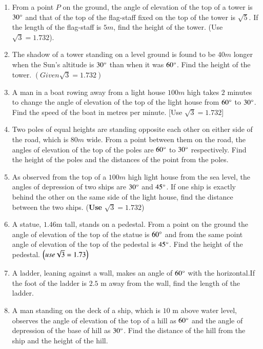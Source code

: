 \begin{enumerate}[label=\thesubsection.\arabic*.,ref=\thesubsection.\theenumi]
\hfill{}\item From a point $P$ on the ground, the angle of elevation of the top of a tower is $30\degree$ and that of the top of the flag-staff fixed on the top of the tower is $\sqrt{5}$. If the length of the flag-staff is $5 m$, find the height of the tower. (Use $\sqrt{3}= 1.732$).


\hfill{}\item The shadow of a tower standing on a level ground is found to be $40 m$ longer when the Sun's altitude is $30\degree$ than when it was $60\degree$. Find the height of the tower. $(Given \sqrt{3} = 1.732)$

\hfill{}\item A man in a boat rowing away from a light house $100m$  high takes $2$ minutes to change the angle of elevation of the top of the light house from $60\degree$ to $30\degree$. Find the speed of the boat in metres per minute. [Use $\sqrt{3}=1.732$]
\hfill{}\item Two poles of equal heights are standing opposite each other on either side of the road, which is $80 m$  wide. From a point between them on the road, the angles of elevation of the top of the poles are $60\degree$ to $30\degree$ respectively. Find the height of the poles and the distances of the point from the poles.
\hfill{}
		\item As observed from the top of a $100 m$ high light house from the sea level, the angles of depression of two ships are $30\degree$ and $45\degree$. If one ship is exactly behind the other on the same side of the light house, find the distance between the two ships. ({\textbf{Use}} $\sqrt3 = 1.732$)
\hfill{}
\item A statue, $1.46$m tall, stands on a pedestal. From a point on the ground the angle of elevation of the top of the statue is $60\degree{}$ and from the same point angle of elevation of the top of the pedestal is $45\degree{}$. Find the height of the pedestal. $\left(use \sqrt{3}=1.73\right)$
\hfill{}
\item A ladder, leaning against a wall, makes an angle of $60 \degree$ with the horizontal.If the foot of the ladder is $2.5$ m away from the wall, find the length of the ladder.\\
\hfill{}\item  A man standing on the deck of a ship, which is $10$ m above water level, observes the angle of elevation of the top of a hill as $ 60\degree $ and the angle of depression of the base of hill as $ 30 \degree $. Find the distance of the hill from the ship and the height of the hill.\\

\end{enumerate}
